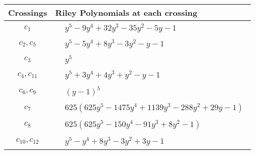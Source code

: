 \documentclass[1p]{elsarticle_modified}
\theoremstyle{definition}
\begin{document}
\begin{tabular}{m{50pt}|m{274pt}}
Crossings & \hspace{64pt}Riley Polynomials at each crossing \\
\hline $$\begin{aligned}c_{1}\end{aligned}$$&$\begin{aligned}
&y^5-9 y^4+32 y^3-35 y^2-5 y-1
\end{aligned}$\\
\hline $$\begin{aligned}c_{2},c_{5}\end{aligned}$$&$\begin{aligned}
&y^5-5 y^4+8 y^3-3 y^2- y-1
\end{aligned}$\\
\hline $$\begin{aligned}c_{3}\end{aligned}$$&$\begin{aligned}
&y^5
\end{aligned}$\\
\hline $$\begin{aligned}c_{4},c_{11}\end{aligned}$$&$\begin{aligned}
&y^5+3 y^4+4 y^3+y^2- y-1
\end{aligned}$\\
\hline $$\begin{aligned}c_{6},c_{9}\end{aligned}$$&$\begin{aligned}
&(y-1)^5
\end{aligned}$\\
\hline $$\begin{aligned}c_{7}\end{aligned}$$&$\begin{aligned}
&625(625 y^5-1475 y^4+1139 y^3-288 y^2+29 y-1)
\end{aligned}$\\
\hline $$\begin{aligned}c_{8}\end{aligned}$$&$\begin{aligned}
&625(625 y^5-150 y^4-91 y^3+8 y^2-1)
\end{aligned}$\\
\hline $$\begin{aligned}c_{10},c_{12}\end{aligned}$$&$\begin{aligned}
&y^5- y^4+8 y^3-3 y^2+3 y-1
\end{aligned}$\\
\hline
\end{tabular}\\~\\
\end{document}
